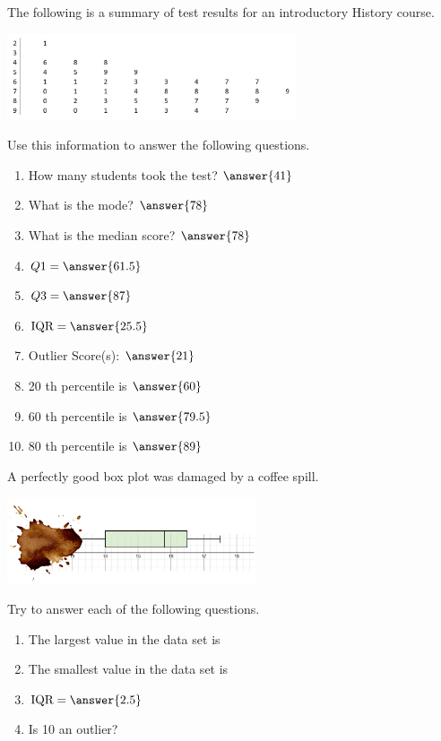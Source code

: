 \documentclass{ximera}
\begin{document}
\begin{problem}\label{prob:140hom2prob4}
The following is a summary of test results for an introductory History course.
\begin{image}
   \includegraphics[height=1in]{140H2pic1.jpg}
 \end{image}
 
 Use this information to answer the following questions.
 
 \begin{enumerate}
     \item How many students took the test? $\answer{41}$
     \item What is the mode? $\answer{78}$
     \item What is the median score? $\answer{78}$
     \item $Q1=\answer{61.5}$
     \item $Q3=\answer{87}$
     \item $\mbox{IQR}=\answer{25.5}$
     \item Outlier Score(s): $\answer{21}$
     \item 20 th percentile is $\answer{60}$
     \item 60 th percentile is $\answer{79.5}$
     \item 80 th percentile is $\answer{89}$
 \end{enumerate}
\end{problem}

\begin{problem}\label{prob:140hom2prob5}
A perfectly good box plot was damaged by a coffee spill.  
\begin{image}
   \includegraphics[height=1in]{140H2pic8.jpg}
 \end{image}
 Try to answer each of the following questions.
 \begin{enumerate}
     \item The largest value in the data set is 
     \item The smallest value in the data set is 
     \item $\mbox{IQR}=\answer{2.5}$
     \item Is 10 an outlier? 
 \end{enumerate}
 
 \end{problem}
\end{document}

